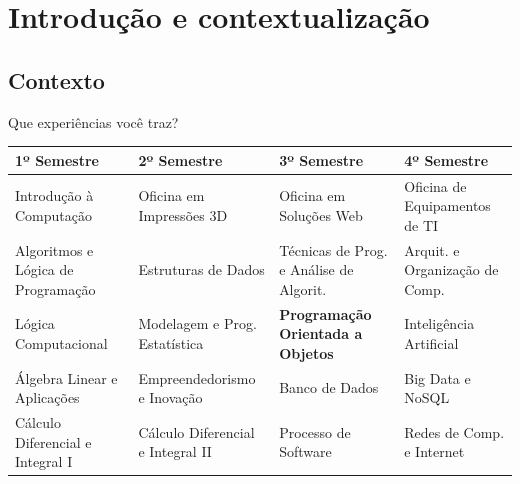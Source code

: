 



\startLectureFile

\section{Introdução e contextualização}

\subsection{Contexto}

\begin{frame}{Que experiências você traz?}
\scriptsize
\setlength{\tabcolsep}{2pt}
\begin{tabular}{p{}p{}p{}p{}}
\toprule
\textbf{1º Semestre} & \textbf{2º Semestre} & \textbf{3º Semestre} & \textbf{4º Semestre} \\
\midrule
Introdução à Computação & Oficina em Impressões 3D & Oficina em Soluções Web & Oficina de Equipamentos de TI \\
\addlinespace
Algoritmos e Lógica de Programação & Estruturas de Dados & Técnicas de Prog. e Análise de Algorit. & Arquit. e Organização de Comp. \\
\addlinespace
Lógica Computacional & Modelagem e Prog. Estatística & \textbf{Programação Orientada a Objetos} & Inteligência Artificial \\
\addlinespace
Álgebra Linear e Aplicações & Empreendedorismo e Inovação & Banco de Dados & Big Data e NoSQL \\
\addlinespace
Cálculo Diferencial e Integral I & Cálculo Diferencial e Integral II & Processo de Software & Redes de Comp. e Internet \\
\bottomrule
\end{tabular}

\end{frame}

